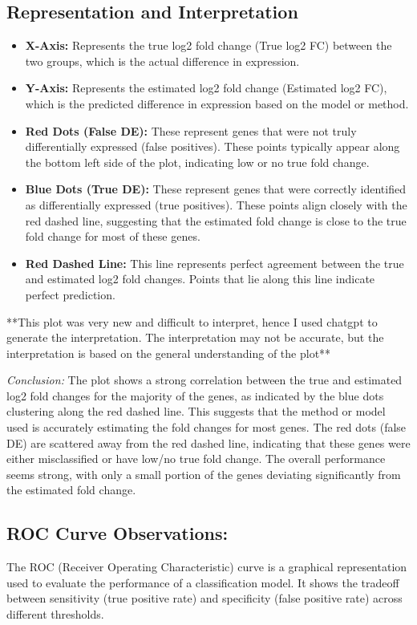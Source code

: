\documentclass[12pt]{article}
\begin{document}
\subsection*{Representation and Interpretation}
\begin{itemize}
  \item \textbf{X-Axis:} Represents the true log2 fold change (True log2 FC) between the two groups, which is the actual difference in expression.
  \item \textbf{Y-Axis:} Represents the estimated log2 fold change (Estimated log2 FC), which is the predicted difference in expression based on the model or method.
  \item \textbf{Red Dots (False DE):} These represent genes that were not truly differentially expressed (false positives). These points typically appear along the bottom left side of the plot, indicating low or no true fold change.
  \item \textbf{Blue Dots (True DE):} These represent genes that were correctly identified as differentially expressed (true positives). These points align closely with the red dashed line, suggesting that the estimated fold change is close to the true fold change for most of these genes.
  \item \textbf{Red Dashed Line:} This line represents perfect agreement between the true and estimated log2 fold changes. Points that lie along this line indicate perfect prediction.
\end{itemize}

**This plot was very new and difficult to interpret, hence I used chatgpt to generate the interpretation. The interpretation may not be accurate, but the interpretation is based on the general understanding of the plot**\newline

\textit{Conclusion:} The plot shows a strong correlation between the true and estimated log2 fold changes for the majority of the genes, as indicated by the blue dots clustering along the red dashed line. This suggests that the method or model used is accurately estimating the fold changes for most genes. The red dots (false DE) are scattered away from the red dashed line, indicating that these genes were either misclassified or have low/no true fold change. The overall performance seems strong, with only a small portion of the genes deviating significantly from the estimated fold change.


\subsection{ROC Curve Observations:} The ROC (Receiver Operating Characteristic) curve is a graphical representation used to evaluate the performance of a classification model. It shows the tradeoff between sensitivity (true positive rate) and specificity (false positive rate) across different thresholds.
\end{document}
